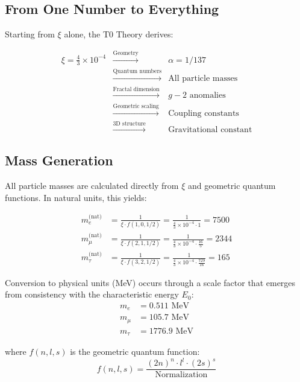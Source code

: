 \documentclass[12pt,a4paper]{article}
\theoremstyle{definition}
\begin{document}
	\subsection{From One Number to Everything}
	
	Starting from $\xi$ alone, the T0 Theory derives:
	
	\begin{equation}
		\begin{array}{rcl}
			\xi = \frac{4}{3} \times 10^{-4} & \xrightarrow{\text{Geometry}} & \alpha = 1/137\\
			& \xrightarrow{\text{Quantum numbers}} & \text{All particle masses}\\
			& \xrightarrow{\text{Fractal dimension}} & g-2\text{ anomalies}\\
			& \xrightarrow{\text{Geometric scaling}} & \text{Coupling constants}\\
			& \xrightarrow{\text{3D structure}} & \text{Gravitational constant}
		\end{array}
	\end{equation}
	
	\subsection{Mass Generation}
	
	All particle masses are calculated directly from $\xi$ and geometric quantum functions. In natural units, this yields:
	
	\begin{align}
		m_e^{\text{(nat)}} &= \frac{1}{\xi \cdot f(1,0,1/2)} = \frac{1}{\frac{4}{3} \times 10^{-4} \cdot 1} = 7500 \\
		m_\mu^{\text{(nat)}} &= \frac{1}{\xi \cdot f(2,1,1/2)} = \frac{1}{\frac{4}{3} \times 10^{-4} \cdot \frac{16}{5}} = 2344 \\
		m_\tau^{\text{(nat)}} &= \frac{1}{\xi \cdot f(3,2,1/2)} = \frac{1}{\frac{4}{3} \times 10^{-4} \cdot \frac{729}{16}} = 165
	\end{align}
	
	Conversion to physical units (MeV) occurs through a scale factor that emerges from consistency with the characteristic energy $E_0$:
	\begin{align}
		m_e &= 0.511 \text{ MeV} \\
		m_\mu &= 105.7 \text{ MeV} \\
		m_\tau &= 1776.9 \text{ MeV}
	\end{align}
	
	where $f(n,l,s)$ is the geometric quantum function:
	\begin{equation}
		f(n,l,s) = \frac{(2n)^n \cdot l^l \cdot (2s)^s}{\text{Normalization}}
	\end{equation}
	
\end{document}
